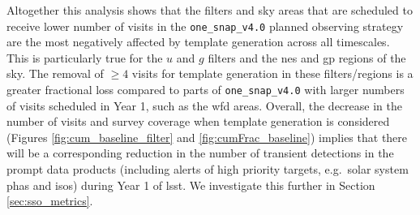 \documentclass[preprintm,linenumbers]{aastex631}
\newcommand{\baseline}{\texttt{one\_snap\_v4.0}\xspace}
\begin{document}
  Altogether this analysis shows that the filters and sky areas that are scheduled to receive lower number of visits in the \baseline planned observing strategy are the most negatively affected by template generation across all timescales.
  This is particularly true for the $u$ and $g$ filters and the \gls*{nes} and \gls*{gp} regions of the sky.
  The removal of $\geq4$ visits for template generation in these filters/regions is a greater fractional loss compared to parts of \baseline with larger numbers of visits scheduled in Year 1, such as the \gls*{wfd} areas.
		Overall, the decrease in the number of visits and survey coverage when template generation is considered (Figures \ref{fig:cum_baseline_filter} and \ref{fig:cumFrac_baseline}) implies that there will be a corresponding reduction in the number of transient detections in the prompt data products (including alerts of high priority targets, e.g.\ solar system \glspl*{pha} and \glspl*{iso}) during Year 1 of \gls*{lsst}.
  We investigate this further in Section \ref{sec:sso_metrics}.
		\\

		
		

    			
\end{document}
